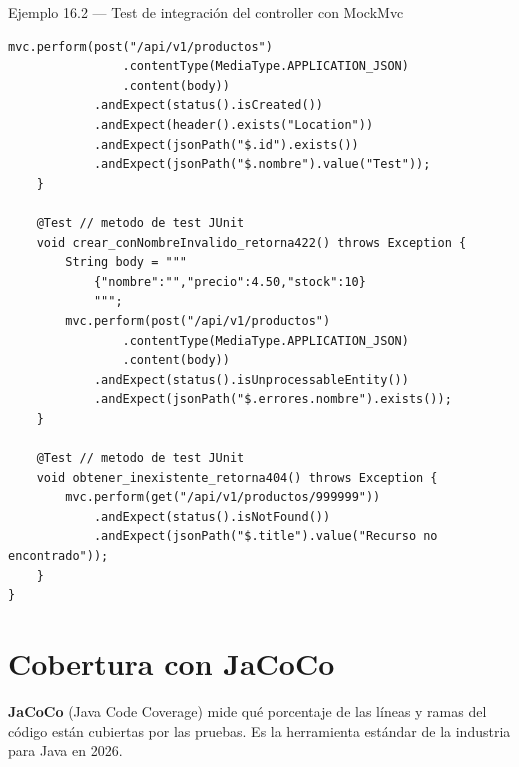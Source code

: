 \begin{cajaejemplo}{Ejemplo 16.2 --- Test de integración del controller con MockMvc}
\begin{lstlisting}[style=java,caption={ProductoControllerIT.java},label=lst:16.2]
        mvc.perform(post("/api/v1/productos")
                .contentType(MediaType.APPLICATION_JSON)
                .content(body))
            .andExpect(status().isCreated())
            .andExpect(header().exists("Location"))
            .andExpect(jsonPath("$.id").exists())
            .andExpect(jsonPath("$.nombre").value("Test"));
    }

    @Test // metodo de test JUnit
    void crear_conNombreInvalido_retorna422() throws Exception {
        String body = """
            {"nombre":"","precio":4.50,"stock":10}
            """;
        mvc.perform(post("/api/v1/productos")
                .contentType(MediaType.APPLICATION_JSON)
                .content(body))
            .andExpect(status().isUnprocessableEntity())
            .andExpect(jsonPath("$.errores.nombre").exists());
    }

    @Test // metodo de test JUnit
    void obtener_inexistente_retorna404() throws Exception {
        mvc.perform(get("/api/v1/productos/999999"))
            .andExpect(status().isNotFound())
            .andExpect(jsonPath("$.title").value("Recurso no encontrado"));
    }
}
\end{lstlisting}
\end{cajaejemplo}

\section{Cobertura con JaCoCo}

\textbf{JaCoCo} (Java Code Coverage) mide qué porcentaje de las
líneas y ramas del código están cubiertas por las pruebas. Es la
herramienta estándar de la industria para Java en 2026.

